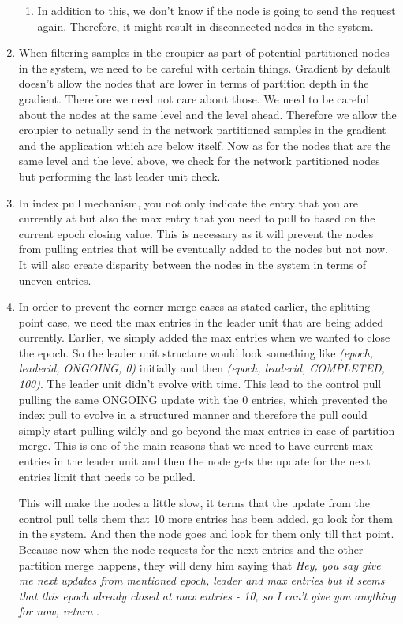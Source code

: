 \documentclass[a4paper, 11pt]{article}
\begin{document}
\begin{enumerate}
\begin{enumerate}
\item In addition to this, we don't know if the node is going to send the request again. Therefore, it might result in disconnected nodes in the system.

\end{enumerate}


\item When filtering samples in the croupier as part of potential partitioned nodes in the system, we need to be careful with certain things. Gradient by default doesn't allow the nodes that are lower in terms of partition depth in the gradient. Therefore we need not care about those. We need to be careful about the nodes at the same level and the level ahead. Therefore we allow the croupier to actually send in the network partitioned samples in the gradient and the application which are below itself. Now as for the nodes that are the same level and the level above, we check for the network partitioned nodes but performing the last leader unit check.


\item In index pull mechanism, you not only indicate the entry that you are currently at but also the max entry that you need to pull to based on the current epoch closing value. This is necessary as it will prevent the nodes from pulling entries that will be eventually added to the nodes but not now. It will also create disparity between the nodes in the system in terms of uneven entries. 

\item In order to prevent the corner merge cases as stated earlier, the splitting point case, we need the max entries in the leader unit that are being added currently. Earlier, we simply added the max entries when we wanted to close the epoch. So the leader unit structure would look something like \textit{(epoch, leaderid, ONGOING, 0)} initially and then \textit{(epoch, leaderid, COMPLETED, 100)}. The leader unit didn't evolve with time. This lead to the control pull pulling the same \textsc{ONGOING} update with the 0 entries, which prevented the index pull to evolve in a structured manner and therefore the pull could simply start pulling wildly and go beyond the max entries in case of partition merge. This is one of the main reasons that we need to have current max entries in the leader unit and then the node gets the update for the next entries limit that needs to be pulled. 

This will make the nodes a little slow, it terms that the update from the control pull tells them that 10 more entries has been added, go look for them in the system.  And then the node goes and look for them only till that point. Because now when the node requests for the next entries and the other partition merge happens, they will deny him saying that \textit{Hey, you say give me next updates from mentioned epoch, leader and max entries but it seems that this epoch already closed at max entries - 10, so I can't give you anything for now, return }. 


\end{enumerate}
\end{document}
